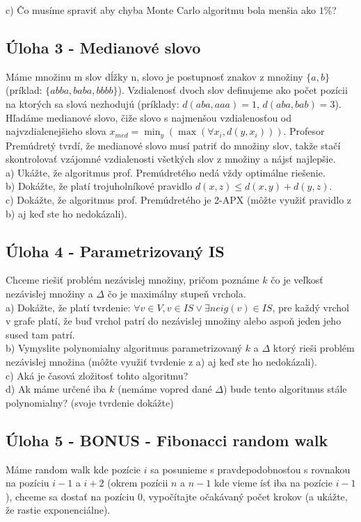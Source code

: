 \documentclass[a4paper]{article}
\begin{document}
c) Čo musíme spraviť aby chyba Monte Carlo algoritmu bola menšia ako $1\%$?

\subsection*{Úloha 3 - Medianové slovo}

Máme množinu m slov dĺžky n, slovo je postupnosť znakov z množiny $\{a,b\}$ (príklad: $\{abba, baba, bbbb\}$). Vzdialenosť dvoch slov definujeme ako počet pozícii na ktorých sa slová nezhodujú (príklady: $d(aba, aaa) = 1$, $d(aba, bab) = 3$). Hľadáme medianové slovo, čiže slovo s najmenšou vzdialenosťou od najvzdialenejšieho slova $x_{med} = \min_y(\max(\forall x_i, d(y, x_i)))$. Profesor Premúdretý tvrdí, že medianové slovo musí patriť do množiny slov, takže stačí skontrolovať vzájomné vzdialenosti všetkých slov z množiny a nájsť najlepšie.
\\

a) Ukážte, že algoritmus prof. Premúdretého nedá vždy optimálne riešenie.
\\

b) Dokážte, že platí trojuholníkové pravidlo $d(x,z) \leq d(x,y) + d(y,z)$.
\\

c) Dokážte, že algoritmus prof. Premúdretého je 2-APX (môžte využiť pravidlo z b) aj keď ste ho nedokázali).

\subsection*{Úloha 4 - Parametrizovaný IS}

Chceme riešiť problém nezávislej množiny, pričom poznáme $k$ čo je veľkosť nezávislej množiny a $\Delta$ čo je maximálny stupeň vrchola. 
\\

a) Dokážte, že platí tvrdenie: $\forall v \in V, v \in IS \lor \exists neig(v) \in IS $, pre každý vrchol v grafe platí, že buď vrchol patrí do nezávislej množiny alebo aspoň jeden jeho sused tam patrí.
\\

b) Vymyslite polynomialny algoritmus parametrizovaný $k$ a $\Delta$ ktorý rieši problém nezávislej množina (môžte využiť tvrdenie z a) aj keď ste ho nedokázali).
\\

c) Aká je časová zložitosť tohto algoritmu?
\\

d) Ak máme určené iba $k$ (nemáme vopred dané $\Delta$) bude tento algoritmus stále polynomialny? (svoje tvrdenie dokážte)

\subsection*{Úloha 5 - BONUS - Fibonacci random walk}

Máme random walk kde  pozície $i$ sa posunieme s pravdepodobnosťou s rovnakou na pozíciu $i-1$ a $i+2$ (okrem pozícii $n$ a $n-1$ kde vieme ísť iba na pozície $i-1$), chceme sa dostať na pozíciu 0, vypočítajte očakávaný počet krokov (a ukážte, že rastie exponenciálne).
\end{document}

